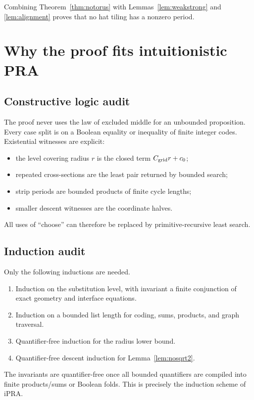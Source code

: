 \documentclass[11pt]{article}
\newcommand{\iPRA}{\mathrm{iPRA}}
\begin{document}
Combining Theorem~\ref{thm:notorus} with Lemmas~\ref{lem:weakstrong} and
\ref{lem:alignment} proves that no hat tiling has a nonzero period.

\section{Why the proof fits intuitionistic PRA}\label{sec:ipra-audit}

\subsection{Constructive logic audit}
The proof never uses the law of excluded middle for an unbounded proposition.  Every
case split is on a Boolean equality or inequality of finite integer codes.  Existential
witnesses are explicit:
\begin{itemize}
\item the level covering radius $r$ is the closed term $C_{\rm grid}r+c_0$;
\item repeated cross-sections are the least pair returned by bounded search;
\item strip periods are bounded products of finite cycle lengths;
\item smaller descent witnesses are the coordinate halves.
\end{itemize}
All uses of ``choose'' can therefore be replaced by primitive-recursive least search.

\subsection{Induction audit}
Only the following inductions are needed.
\begin{enumerate}[label=(\roman*)]
\item Induction on the substitution level, with invariant a finite conjunction of exact
geometry and interface equations.
\item Induction on a bounded list length for coding, sums, products, and graph traversal.
\item Quantifier-free induction for the radius lower bound.
\item Quantifier-free descent induction for Lemma~\ref{lem:nosqrt2}.
\end{enumerate}
The invariants are quantifier-free once all bounded quantifiers are compiled into finite
products/sums or Boolean folds.  This is precisely the induction scheme of $\iPRA$.
\end{document}
